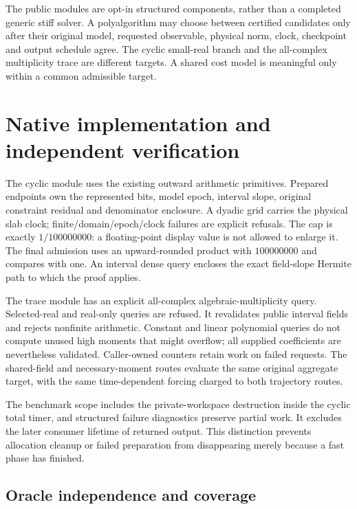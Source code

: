 \documentclass[aps,pra,reprint,onecolumn,10pt,notitlepage,nofootinbib]{revtex4-2}
\begin{document}
The public modules are opt-in structured components, rather than a completed
generic stiff solver. A polyalgorithm may choose between certified candidates
only after their original model, requested observable, physical norm, clock,
checkpoint and output schedule agree. The cyclic small-real branch and the
all-complex multiplicity trace are different targets. A shared cost model is
meaningful only within a common admissible target.



\section{Native implementation and independent verification}

The cyclic module uses the existing outward arithmetic primitives. Prepared
endpoints own the represented bits, model epoch, interval slope, original
constraint residual and denominator enclosure. A dyadic grid carries the
physical slab clock; finite/domain/epoch/clock failures are explicit refusals.
The cap is exactly $1/100000000$: a floating-point display value is not allowed
to enlarge it. The final admission uses an upward-rounded product with
$100000000$ and compares with one. An interval dense query encloses the exact
field-slope Hermite path to which the proof applies.

The trace module has an explicit all-complex algebraic-multiplicity query.
Selected-real and real-only queries are refused. It revalidates public interval
fields and rejects nonfinite arithmetic. Constant and linear polynomial queries
do not compute unused high moments that might overflow; all supplied
coefficients are nevertheless validated. Caller-owned counters retain work
on failed requests. The shared-field and necessary-moment routes evaluate the
same original aggregate target, with the same time-dependent forcing charged
to both trajectory routes.

The benchmark scope includes the private-workspace destruction inside the
cyclic total timer, and structured failure diagnostics preserve partial work.
It excludes the later consumer lifetime of returned output. This distinction
prevents allocation cleanup or failed preparation from disappearing merely
because a fast phase has finished.

\subsection{Oracle independence and coverage}
\end{document}
